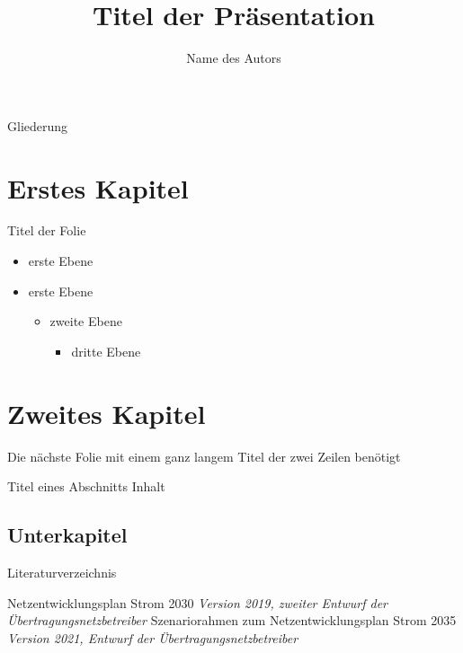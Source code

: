 \documentclass[aspectratio=169]{beamer}
\begin{document}
\author{Name des Autors}
\title{Titel der Präsentation}

\maketitle

\begin{frame}{Gliederung}
\tableofcontents
\end{frame}

\section{Erstes Kapitel}
\begin{frame}{Titel der Folie}

      	\begin{itemize}
      		\item erste Ebene
      		\item erste Ebene
      		\begin{itemize}
      			\item zweite Ebene
      			   \begin{itemize}
      					\item dritte Ebene
      				\end{itemize}
      		\end{itemize}
      		
      	\end{itemize}
\end{frame}

\section{Zweites Kapitel}
\begin{frame}{Die nächste Folie mit einem ganz langem Titel der zwei Zeilen benötigt}

	\begin{block}{Titel eines Abschnitts}
	Inhalt
	\end{block}
\end{frame}
\subsection{Unterkapitel}


\begin{frame}{Literaturverzeichnis}
\begin{thebibliography}{11}

 Netzentwicklungsplan Strom 2030
	\newblock \emph{Version 2019, zweiter Entwurf der Übertragungsnetzbetreiber}
 Szenariorahmen zum Netzentwicklungsplan Strom 2035
	\newblock \emph{Version 2021, Entwurf der Übertragungsnetzbetreiber}

\end{thebibliography}
\end{frame}
\end{document}
